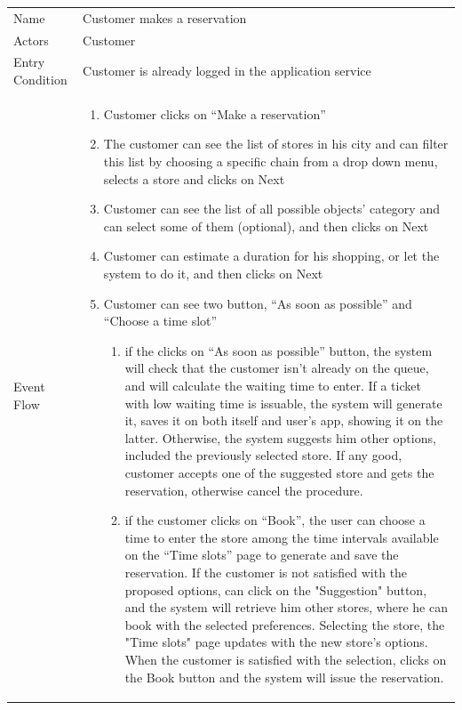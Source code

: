 \documentclass{article}
\newcommand\xrowht[2][0]
{\addstackgap[.5\dimexpr#2\relax]{\vphantom{#1}}}
\begin{document}
				\begin{center}
					
					
					\begin{adjustwidth}{-3cm}{}
					\begin{tabular}[h!]{|m{7.5em}|m{36em}|}
						
						\hline
						\xrowht{5pt}
						Name & Customer makes a reservation\\
						\xrowht{5pt}
						Actors & Customer\\
						\xrowht{5pt}
						Entry Condition & Customer is already logged in the application service\\
						\xrowht{5pt}
						Event Flow & \begin{enumerate}
							
							\itemsep-0.25em
							\item Customer clicks on “Make a reservation”
							\item The customer can see the list of stores in his city and can filter this list by choosing a specific chain from a drop down menu, selects a store and clicks on Next
							\item Customer can see the list of all possible objects’ category and can select some of them (optional), and then clicks on Next
							\item Customer can estimate a duration for his shopping, or let the system to do it, and then clicks on Next
							\item Customer can see two button, “As soon as possible” and “Choose a time slot”
							 
							\begin{enumerate}
								
								\itemsep-0.25em
								\item if the clicks on “As soon as possible” button, the system will check that the customer isn't already on the queue, and will calculate the waiting time to enter. If a ticket with low waiting time is issuable, the system will generate it, saves it on both itself and user's app, showing it on the latter.
									 Otherwise, the system suggests him other options, included the previously selected store. If any good, customer accepts one of the suggested store and gets the reservation, otherwise cancel the procedure.
									 \medskip	

								
								\item if the customer clicks on “Book”, the user can choose a time to enter the store among the time intervals available on the “Time slots” page to generate and save the reservation. If the customer is not satisfied with the proposed options, can click on the "Suggestion" button, and the system will retrieve him other stores, where he can book with the selected preferences. Selecting the store, the "Time slots" page updates with the new store's options. When the customer is satisfied with the selection, clicks on the Book button and the system will issue the reservation.
								

\end{enumerate}
\end{enumerate}
\end{tabular}
\end{adjustwidth}
\end{center}
\end{document}
